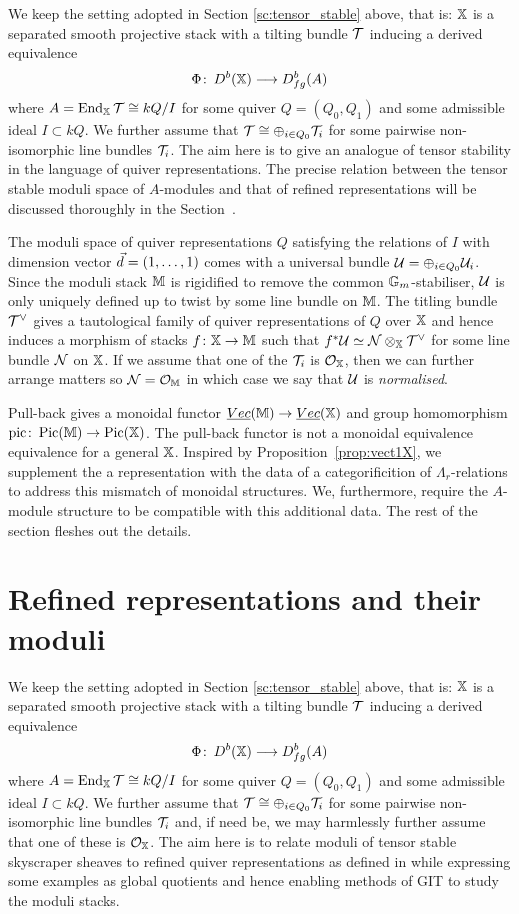\documentclass[12pt]{amsart}
\begin{document}
We keep the setting adopted in Section \ref{sc:tensor_stable} above, that is: $\mathbb{X}$ is a separated smooth projective stack with a tilting bundle $\mathcal{T}$ inducing a derived equivalence $$\Phi \colon \, D^b(\mathbb{X}) \longrightarrow D^b_{fg}(A)$$ where $A=\operatorname{End}_{\mathbb{X}} \mathcal{T} \cong kQ/I$ for some quiver $Q = (Q_0,Q_1)$ and some admissible ideal $I\subset kQ$. 
We further assume that $\mathcal{T} \cong \oplus_{i\in Q_0} \mathcal{T}_i$ for some pairwise non-isomorphic line bundles $\mathcal{T}_i$.
The aim here is to give an analogue of tensor stability in the language of quiver representations.
The precise relation between the tensor stable moduli space of $A$-modules and that of refined representations will be discussed thoroughly in the Section~\label{sc:Picard}.

The moduli space of quiver representations $Q$ satisfying the relations of $I$ with dimension vector ${\vec{d}} = (1, \ldots, 1)$ comes with a universal bundle $\mathcal{U}  = \oplus_{i \in Q_0} \mathcal{U}_i$.
Since the moduli stack $\mathbb{M}$ is rigidified to remove the common $\mathbb{G}_m$-stabiliser, $\mathcal{U}$ is only uniquely defined up to twist by some line bundle on $\mathbb{M}$.
The titling bundle $\mathcal{T}^{\vee}$ gives a tautological family of quiver representations of $Q$ over $\mathbb{X}$ and hence induces a morphism of stacks $f \colon \mathbb{X} \rightarrow \mathbb{M}$ such that $f^* \mathcal{U} \simeq \mathcal{N} \otimes_{\mathbb{X}} \mathcal{T}^{\vee}$ for some line bundle $\mathcal{N}$ on $\mathbb{X}$.
If we assume that one of the $\mathcal{T}_i$ is $\mathcal{O}_{\mathbb{X}}$, then we can further arrange matters so $\mathcal{N} = \mathcal{O}_{\mathbb{M}}$ in which case we say that $\mathcal{U}$ is {\em normalised}.

Pull-back gives a monoidal functor $\underline{Vec}(\mathbb{M}) \rightarrow \underline{Vec}(\mathbb{X})$ and group homomorphism $\text{pic} \colon \operatorname{Pic}(\mathbb{M}) \rightarrow \operatorname{Pic}(\mathbb{X})$.
The pull-back functor is not a monoidal equivalence equivalence for a general $\mathbb{X}$.
Inspired by Proposition~\ref{prop:vect1X}, we supplement the a representation with the data of a categorificition of $\Lambda_r$-relations to address this mismatch of monoidal structures.
We, furthermore, require the $A$-module structure to be compatible with this additional data.
The rest of the section fleshes out the details. 

\section{Refined representations and their moduli}  \label{sec:refined}

We keep the setting adopted in Section \ref{sc:tensor_stable} above, that is: $\mathbb{X}$ is a separated smooth projective stack with a tilting bundle $\mathcal{T}$ inducing a derived equivalence $$\Phi \colon \, D^b(\mathbb{X}) \longrightarrow D^b_{fg}(A)$$ where $A=\operatorname{End}_{\mathbb{X}} \mathcal{T} \cong kQ/I$ for some quiver $Q = (Q_0,Q_1)$ and some admissible ideal $I\subset kQ$. We further assume that $\mathcal{T} \cong \oplus_{i\in Q_0} \mathcal{T}_i$ for some pairwise non-isomorphic line bundles $\mathcal{T}_i$ and, if need be, we may harmlessly further assume that one of these is $\mathcal{O}_{\mathbb{X}}$. The aim here is to relate moduli of tensor stable skyscraper sheaves to refined quiver representations as defined in \cite{AU} while expressing some examples as global quotients and hence enabling methods of GIT to study the moduli stacks. 
\end{document}
